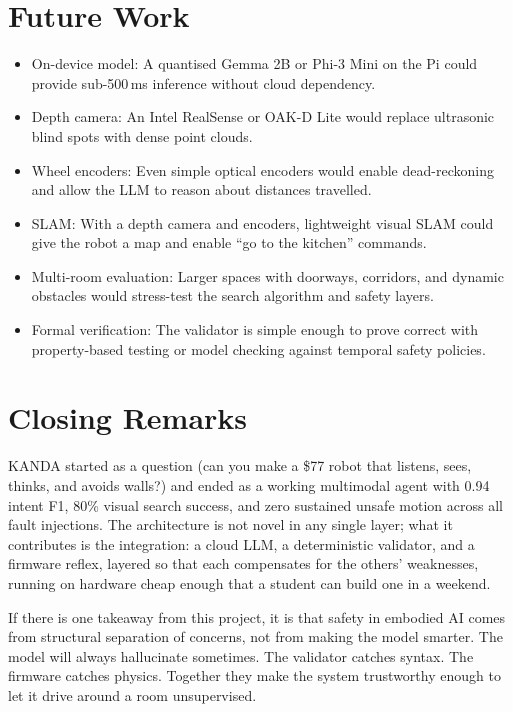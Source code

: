 \section{Future Work}
\label{sec:future}

\begin{itemize}[nosep]
  \item On-device model: A quantised Gemma 2B or Phi-3 Mini on the Pi could provide sub-500\,ms inference without cloud dependency.
  \item Depth camera: An Intel RealSense or OAK-D Lite would replace ultrasonic blind spots with dense point clouds.
  \item Wheel encoders: Even simple optical encoders would enable dead-reckoning and allow the LLM to reason about distances travelled.
  \item SLAM: With a depth camera and encoders, lightweight visual SLAM could give the robot a map and enable ``go to the kitchen'' commands.
  \item Multi-room evaluation: Larger spaces with doorways, corridors, and dynamic obstacles would stress-test the search algorithm and safety layers.
  \item Formal verification: The validator is simple enough to prove correct with property-based testing or model checking against temporal safety policies.
\end{itemize}

\section{Closing Remarks}
\label{sec:ch9closing}

KANDA started as a question (can you make a \$77 robot that listens, sees, thinks, and avoids walls?) and ended as a working multimodal agent with 0.94 intent F1, 80\% visual search success, and zero sustained unsafe motion across all fault injections. The architecture is not novel in any single layer; what it contributes is the integration: a cloud LLM, a deterministic validator, and a firmware reflex, layered so that each compensates for the others' weaknesses, running on hardware cheap enough that a student can build one in a weekend.

If there is one takeaway from this project, it is that safety in embodied AI comes from structural separation of concerns, not from making the model smarter. The model will always hallucinate sometimes. The validator catches syntax. The firmware catches physics. Together they make the system trustworthy enough to let it drive around a room unsupervised.
